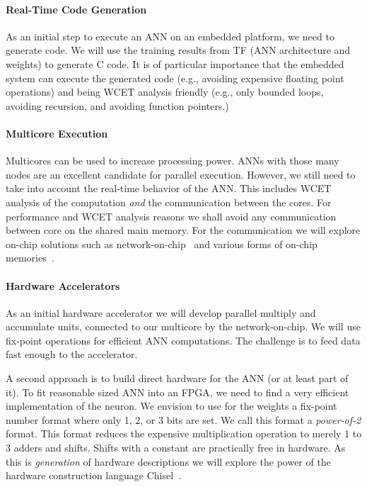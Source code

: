 \documentclass[fleqn,12pt]{article}
\begin{document}
\paragraph{Real-Time Code Generation}

As an initial step to execute an ANN on an embedded platform, we need to
generate code. We will use the training results from TF
(ANN architecture and weights) to generate C code.
It is of particular importance that the embedded system can execute
the generated code (e.g., avoiding expensive floating point operations) and
being WCET analysis friendly (e.g., only bounded loops, avoiding recursion,
and avoiding function pointers.)

\paragraph{Multicore Execution}

Multicores can be used to increase processing power.
ANNs with those many nodes
are an excellent candidate for parallel execution. However, we still need
to take into account the real-time behavior of the ANN.
This includes WCET analysis of the computation \emph{and} the communication
between the cores.
For performance and WCET analysis reasons we shall avoid any
communication between core on the shared main memory.
For the communication we will explore on-chip solutions such as
network-on-chip~\cite{t-crest:argo:tvlsi2015} and various forms of
on-chip memories~\cite{t-crest:ownspm}.

\paragraph{Hardware Accelerators}

As an initial hardware accelerator we will develop parallel multiply
and accumulate units, connected to our multicore by the network-on-chip.
We will use fix-point operations for efficient ANN computations.
The challenge is to feed data fast enough to
the accelerator.

A second approach is to build direct hardware
for the ANN (or at least part of it). To fit reasonable sized ANN into
an FPGA, we need to find a very efficient implementation of the neuron.
We envision to use for the weights a fix-point number format where
only 1, 2, or 3 bits are set.
We call this format a \emph{power-of-2} format.
This format reduces the expensive multiplication operation to merely 1 to
3 adders and shifts. Shifts with a constant are practically
free in hardware. %
As this is \emph{generation} of hardware descriptions we will
explore the power of the hardware construction language Chisel~\cite{chisel:dac2012}.
\end{document}
